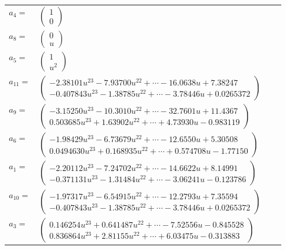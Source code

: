 \documentclass[1p]{elsarticle_modified}
\theoremstyle{definition}
\begin{document}
\begin{tabular}{m{7pt} m{180pt} m{7pt} m{180pt} }
\flushright $a_{4}=$&$\begin{pmatrix}1\\0\end{pmatrix}$ \\
\flushright $a_{8}=$&$\begin{pmatrix}0\\u\end{pmatrix}$ \\
\flushright $a_{5}=$&$\begin{pmatrix}1\\u^2\end{pmatrix}$ \\
\flushright $a_{11}=$&$\begin{pmatrix}-2.38101 u^{23}-7.93700 u^{22}+\cdots-16.0638 u+7.38247\\-0.407843 u^{23}-1.38785 u^{22}+\cdots-3.78446 u+0.0265372\end{pmatrix}$ \\
\flushright $a_{9}=$&$\begin{pmatrix}-3.15250 u^{23}-10.3010 u^{22}+\cdots-32.7601 u+11.4367\\0.503685 u^{23}+1.63902 u^{22}+\cdots+4.73930 u-0.983119\end{pmatrix}$ \\
\flushright $a_{6}=$&$\begin{pmatrix}-1.98429 u^{23}-6.73679 u^{22}+\cdots-12.6550 u+5.30508\\0.0494630 u^{23}+0.168935 u^{22}+\cdots+0.574708 u-1.77150\end{pmatrix}$ \\
\flushright $a_{1}=$&$\begin{pmatrix}-2.20112 u^{23}-7.24702 u^{22}+\cdots-14.6622 u+8.14991\\-0.371131 u^{23}-1.31484 u^{22}+\cdots-3.06241 u-0.123786\end{pmatrix}$ \\
\flushright $a_{10}=$&$\begin{pmatrix}-1.97317 u^{23}-6.54915 u^{22}+\cdots-12.2793 u+7.35594\\-0.407843 u^{23}-1.38785 u^{22}+\cdots-3.78446 u+0.0265372\end{pmatrix}$ \\
\flushright $a_{3}=$&$\begin{pmatrix}0.146254 u^{23}+0.641487 u^{22}+\cdots-7.52556 u-0.845528\\0.836864 u^{23}+2.81155 u^{22}+\cdots+6.03475 u-0.313883\end{pmatrix}$ \\

\end{tabular}
\end{document}
